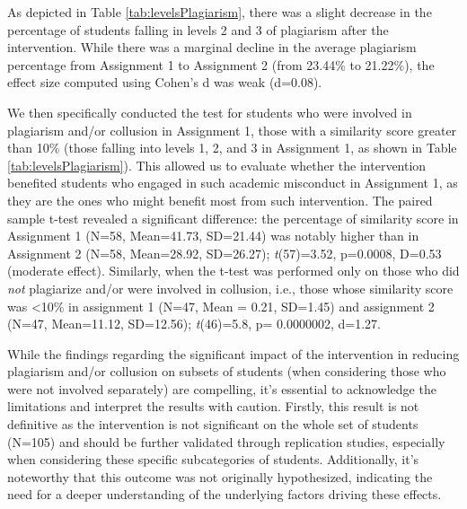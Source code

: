 As depicted in Table \ref{tab:levelsPlagiarism}, there was a slight decrease in the percentage of students falling in levels 2 and 3 of plagiarism after the intervention. While there was a marginal decline in the average plagiarism percentage from Assignment 1 to Assignment 2 (from 23.44\% to 21.22\%), the effect size computed using Cohen's d was weak (d=0.08). \vspace{10pt}

\noindent{}
 \vspace{10pt}

We then specifically conducted the test for students who were involved in plagiarism and/or collusion in Assignment 1, those with a similarity score greater than 10\% (those falling into levels 1, 2, and 3 in Assignment 1, as shown in Table \ref{tab:levelsPlagiarism}). This allowed us to evaluate whether the intervention benefited students who engaged in such academic misconduct in Assignment 1, as they are the ones who might benefit most from such intervention. The paired sample t-test revealed a significant difference: the percentage of similarity score in Assignment 1 (N=58, Mean=41.73, SD=21.44) was notably higher than in Assignment 2 (N=58, Mean=28.92, SD=26.27); \textit{t}(57)=3.52, p=0.0008, D=0.53 (moderate effect). Similarly, when the t-test was performed only on those who did \emph{not} plagiarize and/or were involved in collusion, i.e., those whose similarity score was <10\% in assignment 1 (N=47, Mean = 0.21, SD=1.45) and assignment 2 (N=47, Mean=11.12, SD=12.56); \textit{t}(46)=5.8, p= 0.0000002, d=1.27.

While the findings regarding the significant impact of the intervention in reducing plagiarism and/or collusion on subsets of students (when considering those who were not involved separately) are compelling, it's essential to acknowledge the limitations and interpret the results with caution. Firstly, this result is not definitive as the intervention is not significant on the whole set of students (N=105) and should be further validated through replication studies, especially when considering these specific subcategories of students. Additionally, it's noteworthy that this outcome was not originally hypothesized, indicating the need for a deeper understanding of the underlying factors driving these effects.

